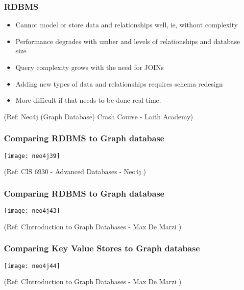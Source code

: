 \begin{frame}\frametitle{RDBMS}

\begin{itemize}
\item Cannot model or store data and relationships well, ie, without complexity
\item Performance degrades with umber and levels of relationships and database size
\item Query complexity grows with the need for JOINs
\item Adding new types of data and relationships requires schema redesign
\item More difficult if that needs to be done real time.
\end{itemize}

{\tiny (Ref: Neo4j (Graph Database) Crash Course - Laith Academy)}
\end{frame}

\begin{frame}\frametitle{Comparing RDBMS to Graph database}

\begin{center}
\texttt{[image: neo4j39]}
\end{center}	  


{\tiny (Ref: CIS 6930 - Advanced Databases - Neo4j )}
\end{frame}

\begin{frame}\frametitle{Comparing RDBMS to Graph database}

\begin{center}
\texttt{[image: neo4j43]}
\end{center}	  


{\tiny (Ref: CIntroduction to Graph Databases - Max De Marzi )}
\end{frame}

\begin{frame}\frametitle{Comparing Key Value Stores to Graph database}

\begin{center}
\texttt{[image: neo4j44]}
\end{center}	  


{\tiny (Ref: CIntroduction to Graph Databases - Max De Marzi )}
\end{frame}

